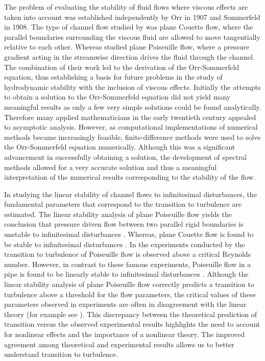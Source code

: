 \documentclass[a4paper, 12pt, twoside, openright]{article}
\numberwithin{equation}{section}
\begin{document}
The problem of evaluating the stability of fluid flows where viscous effects are taken into account was established independently by Orr in 1907 and Sommerfeld in 1908. The type of channel flow studied by \cite{Orr07a,Orr07b} was plane Couette flow, where the parallel boundaries surrounding the viscous fluid are allowed to move tangentially relative to each other. Whereas \cite{Sommerfeld08} studied plane Poiseuille flow, where a pressure gradient acting in the streamwise direction drives the fluid through the channel. The combination of their work led to the derivation of the Orr-Sommerfeld equation, thus establishing a basis for future problems in the study of hydrodynamic stability with the inclusion of viscous effects. Initially the attempts to obtain a solution to the Orr-Sommerfeld equation did not yield many meaningful results as only a few very simple solutions could be found analytically. Therefore many applied mathematicians in the early twentieth century appealed to asymptotic analysis. However, as computational implementations of numerical methods became increasingly feasible, finite-difference methods were used to solve the Orr-Sommerfeld equation numerically. Although this was a significant advancement in successfully obtaining a solution, the development of spectral methods allowed for a very accurate solution and thus a meaningful interpretation of the numerical results corresponding to the stability of the flow. %

In studying the linear stability of channel flows to infinitesimal disturbances, the fundamental parameters that correspond to the transition to turbulence are estimated. The linear stability analysis of plane Poiseuille flow yields the conclusion that pressure driven flow between two parallel rigid boundaries is unstable to infinitesimal disturbances \citep{Orszag71}. Whereas, plane Couette flow is found to be stable to infinitesimal disturbances \citep{Davey73}. In the experiments conducted by \cite{Reynolds1883} the transition to turbulence of Poiseuille flow is observed above a critical Reynolds number. However, in contrast to these famous experiments, Poiseuille flow in a pipe is found to be linearly stable to infinitesimal disturbances \citep{DaveyandDrazin69}. Although the linear stability analysis of plane Poiseuille flow correctly predicts a transition to turbulence above a threshold for the flow parameters, the critical values of these parameters observed in experiments are often in disagreement with the linear theory (for example see \cite{Alavyoon_etal86}). This discrepancy between the theoretical prediction of transition versus the observed experimental results highlights the need to account for nonlinear effects and the importance of a nonlinear theory. The improved agreement among theoretical and experimental results allows us to better understand transition to turbulence. %
\end{document}
